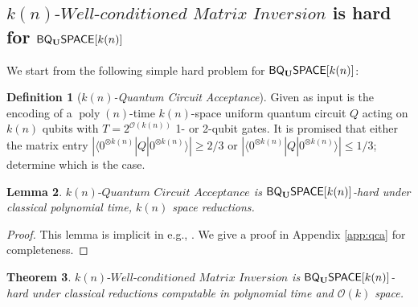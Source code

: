 \documentclass[11pt]{article}
\newtheorem{theorem}{Theorem}
\newtheorem{lemma}[theorem]{Lemma}
\theoremstyle{definition}
\newtheorem{definition}[theorem]{Definition}
\theoremstyle{remark}
\newcommand\matrixinvert[1]{{\ensuremath{#1}}\textit{-Well-conditioned Matrix Inversion}}
\newcommand\qca[1]{\ensuremath{#1}\textit{-Quantum Circuit Acceptance}}
\newcommand{\zero}{\ensuremath{0^{\otimes{k(n)}}}}
\newcommand{\classfont}{\sf}
\newcommand{\Unitary}{\mathbf{U}}
\newcommand{\unitaryBQSPACE}[1]{{\classfont{BQ}_\Unitary\classfont{SPACE}}[#1]}
\newcommand\bigoh{\mathcal{O}}
\DeclareMathOperator{\poly}{poly}
\begin{document}
\subsection{$\matrixinvert{k(n)}$ is hard for $\unitaryBQSPACE{k(n)}$} \label{sec: matrix inversion hard}
We start from the following simple hard problem for $\unitaryBQSPACE{k(n)}$:
\begin{definition}[\qca{k(n)}]
	Given as input is the encoding of a $\poly(n)$-time $k(n)$-space uniform quantum circuit $Q$ acting on $k(n)$ qubits with $T = 2^{\mathcal{O}(k(n))}$ 1- or 2-qubit gates.  It is promised that either the matrix entry $|\langle {\zero}|Q|{\zero}\rangle| \geq 2/3$ or $|\langle {\zero}|Q|{\zero}\rangle| \leq 1/3$; determine which is the case.
\end{definition}
\begin{lemma} \label{lem: quantum circuit acceptance}
	$\qca{k(n)}$ is $\unitaryBQSPACE{k(n)}$-hard under classical polynomial time, $k(n)$ space reductions.
\end{lemma}
\begin{proof}This lemma is implicit in e.g., \cite{bbbv,dawsonnielsen}.  We give a proof in Appendix \ref{app:qca} for completeness.
\end{proof}
\begin{theorem}
$\matrixinvert{k(n)}$ is $\unitaryBQSPACE{k(n)}$-hard under classical reductions computable in polynomial time and $\bigoh (k)$ space.
\end{theorem}
\end{document}
